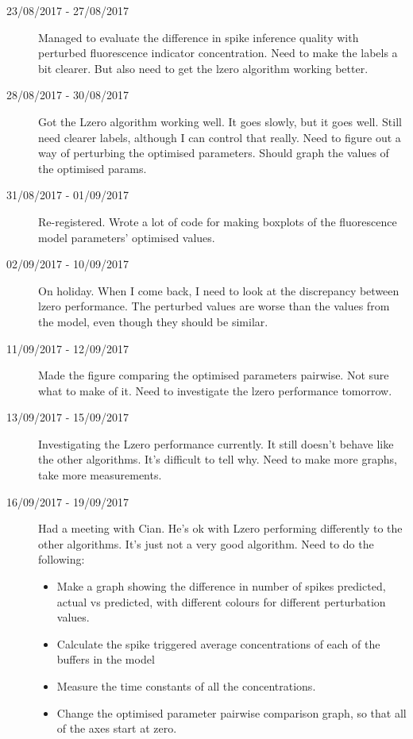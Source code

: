 \documentclass[a4paper,12pt]{article}
\theoremstyle{definition}
\begin{document}
\begin{description}
  \item[23/08/2017 - 27/08/2017] Managed to evaluate the difference in spike inference quality with perturbed fluorescence indicator concentration. Need to make the labels a bit clearer. But also need to get the lzero algorithm working better.

  \item[28/08/2017 - 30/08/2017] Got the Lzero algorithm working well. It goes slowly, but it goes well. Still need clearer labels, although I can control that really. Need to figure out a way of perturbing the optimised parameters. Should graph the values of the optimised params.

  \item[31/08/2017 - 01/09/2017] Re-registered. Wrote a lot of code for making boxplots of the fluorescence model parameters' optimised values.

  \item[02/09/2017 - 10/09/2017] On holiday. When I come back, I need to look at the discrepancy between lzero performance. The perturbed values are worse than the values from the model, even though they should be similar.

  \item[11/09/2017 - 12/09/2017] Made the figure comparing the optimised parameters pairwise. Not sure what to make of it. Need to investigate the lzero performance tomorrow.

  \item[13/09/2017 - 15/09/2017] Investigating the Lzero performance currently. It still doesn't behave like the other algorithms. It's difficult to tell why. Need to make more graphs, take more measurements.

  \item[16/09/2017 - 19/09/2017] Had a meeting with Cian. He's ok with Lzero performing differently to the other algorithms. It's just not a very good algorithm. Need to do the following:
      \begin{itemize}
        \item Make a graph showing the difference in number of spikes predicted, actual vs predicted, with different colours for different perturbation values.
        \item Calculate the spike triggered average concentrations of each of the buffers in the model
        \item Measure the time constants of all the concentrations.
        \item Change the optimised parameter pairwise comparison graph, so that all of the axes start at zero.
      \end{itemize}


\end{description}
\end{document}
